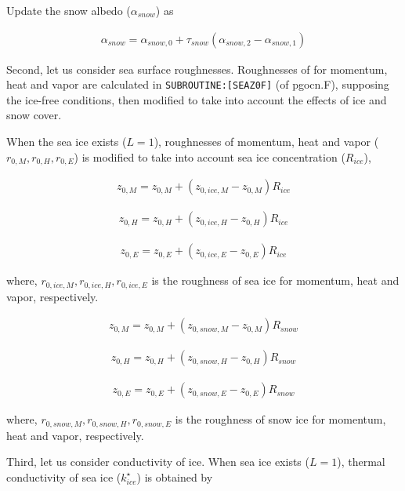 Update the snow albedo (\(\alpha_{snow}\)) as

\begin{eqnarray}
    \alpha_{snow} = \alpha_{snow,0} + \tau_{snow}(\alpha_{snow,2}-\alpha_{snow,1})
\end{eqnarray}

Second, let us consider sea surface roughnesses. Roughnesses of for
momentum, heat and vapor are calculated in
\texttt{SUBROUTINE:{[}SEAZ0F{]}} (of pgocn.F), supposing the ice-free
conditions, then modified to take into account the effects of ice and
snow cover.

When the sea ice exists (\(L=1\)), roughnesses of momentum, heat and
vapor (\(r_{0,M},r_{0,H},r_{0,E}\)) is modified to take into account sea
ice concentration (\(R_{ice}\)),

\begin{eqnarray}
    z_{0,M} = z_{0,M} + ( z_{0,ice,M} - z_{0,M})  R_{ice}
\end{eqnarray}

\begin{eqnarray}
    z_{0,H} = z_{0,H} + ( z_{0,ice,H} - z_{0,H})  R_{ice}
\end{eqnarray}

\begin{eqnarray}
    z_{0,E} = z_{0,E} + ( z_{0,ice,E} - z_{0,E})  R_{ice}
\end{eqnarray}

where, \(r_{0,ice,M},r_{0,ice,H},r_{0,ice,E}\) is the roughness of sea
ice for momentum, heat and vapor, respectively.

\begin{eqnarray}
    z_{0,M} = z_{0,M} + ( z_{0,snow,M} - z_{0,M})  R_{snow}
\end{eqnarray}

\begin{eqnarray}
    z_{0,H} = z_{0,H} + ( z_{0,snow,H} - z_{0,H})  R_{snow}
\end{eqnarray}

\begin{eqnarray}
    z_{0,E} = z_{0,E} + ( z_{0,snow,E} - z_{0,E})  R_{snow}
\end{eqnarray}

where, \(r_{0,snow,M},r_{0,snow,H},r_{0,snow,E}\) is the roughness of
snow ice for momentum, heat and vapor, respectively.

Third, let us consider conductivity of ice. When sea ice exists
(\(L=1\)), thermal conductivity of sea ice (\(k_{ice}^\star\)) is
obtained by

